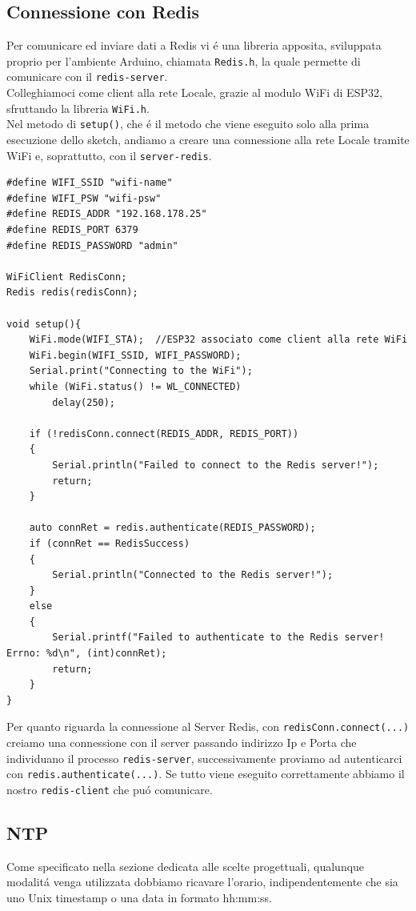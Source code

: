 \subsection{Connessione con Redis}
Per comunicare ed inviare dati a Redis vi é una libreria apposita, sviluppata proprio per l'ambiente Arduino, chiamata \texttt{Redis.h},
la quale permette di comunicare con il \texttt{redis-server}.\\
Colleghiamoci come client alla rete Locale, grazie al modulo WiFi di ESP32, sfruttando la libreria \texttt{WiFi.h}.\\
Nel metodo di \texttt{setup()}, che é il metodo che viene eseguito solo alla prima esecuzione dello sketch, andiamo a creare una connessione alla rete Locale tramite WiFi e, soprattutto, con il \texttt{server-redis}.
\begin{lstlisting}[autogobble]
#define WIFI_SSID "wifi-name"
#define WIFI_PSW "wifi-psw"
#define REDIS_ADDR "192.168.178.25"
#define REDIS_PORT 6379
#define REDIS_PASSWORD "admin"

WiFiClient RedisConn;
Redis redis(redisConn);

void setup(){
    WiFi.mode(WIFI_STA);  //ESP32 associato come client alla rete WiFi
    WiFi.begin(WIFI_SSID, WIFI_PASSWORD);
    Serial.print("Connecting to the WiFi");
    while (WiFi.status() != WL_CONNECTED)
        delay(250);

    if (!redisConn.connect(REDIS_ADDR, REDIS_PORT))
    {
        Serial.println("Failed to connect to the Redis server!");
        return;
    }

    auto connRet = redis.authenticate(REDIS_PASSWORD);
    if (connRet == RedisSuccess)
    {
        Serial.println("Connected to the Redis server!");
    }
    else
    {
        Serial.printf("Failed to authenticate to the Redis server! Errno: %d\n", (int)connRet);
        return;
    }
}
\end{lstlisting}

Per quanto riguarda la connessione al Server Redis,  con \texttt{redisConn.connect(...)} creiamo una connessione con il server
passando indirizzo Ip e Porta che individuano il processo \texttt{redis-server}, successivamente proviamo ad autenticarci con
\texttt{redis.authenticate(...)}. Se tutto viene eseguito correttamente abbiamo il nostro \texttt{redis-client} che puó
comunicare.


\subsection{NTP}
Come specificato nella sezione dedicata alle scelte progettuali, qualunque modalitá venga utilizzata dobbiamo ricavare l'orario,
indipendentemente che sia uno Unix timestamp o una data in formato hh:mm:ss.
